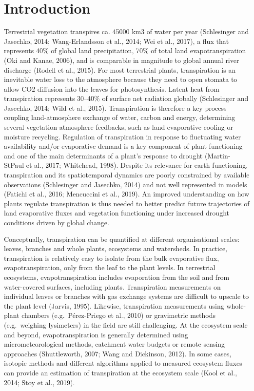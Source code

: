 \documentclass[11pt,twoside]{reedthesis}
\begin{document}
\newpage

\section{Introduction}\label{introduction}

Terrestrial vegetation transpires ca. 45000 km3 of water per year
(Schlesinger and Jasechko, 2014; Wang-Erlandsson et al., 2014; Wei et
al., 2017), a flux that represents 40\% of global land precipitation,
70\% of total land evapotranspiration (Oki and Kanae, 2006), and is
comparable in magnitude to global annual river discharge (Rodell et al.,
2015). For most terrestrial plants, transpiration is an inevitable water
loss to the atmosphere because they need to open stomata to allow CO2
diffusion into the leaves for photosynthesis. Latent heat from
transpiration represents 30--40\% of surface net radiation globally
(Schlesinger and Jasechko, 2014; Wild et al., 2015). Transpiration is
therefore a key process coupling land-atmosphere exchange of water,
carbon and energy, determining several vegetation-atmosphere feedbacks,
such as land evaporative cooling or moisture recycling. Regulation of
transpiration in response to fluctuating water availability and/or
evaporative demand is a key component of plant functioning and one of
the main determinants of a plant's response to drought (Martin‐StPaul et
al., 2017; Whitehead, 1998). Despite its relevance for earth
functioning, transpiration and its spatiotemporal dynamics are poorly
constrained by available observations (Schlesinger and Jasechko, 2014)
and not well represented in models (Fatichi et al., 2016; Mencuccini et
al., 2019). An improved understanding on how plants regulate
transpiration is thus needed to better predict future trajectories of
land evaporative fluxes and vegetation functioning under increased
drought conditions driven by global change.\par

Conceptually, transpiration can be quantified at different
organisational scales: leaves, branches and whole plants, ecosystems and
watersheds. In practice, transpiration is relatively easy to isolate
from the bulk evaporative flux, evapotranspiration, only from the leaf
to the plant levels. In terrestrial ecosystems, evapotranspiration
includes evaporation from the soil and from water-covered surfaces,
including plants. Transpiration measurements on individual leaves or
branches with gas exchange systems are difficult to upscale to the plant
level (Jarvis, 1995). Likewise, transpiration measurements using
whole-plant chambers (e.g.~Pérez-Priego et al., 2010) or gravimetric
methods (e.g.~weighing lysimeters) in the field are still challenging.
At the ecosystem scale and beyond, evapotranspiration is generally
determined using micrometeorological methods, catchment water budgets or
remote sensing approaches (Shuttleworth, 2007; Wang and Dickinson,
2012). In some cases, isotopic methods and different algorithms applied
to measured ecosystem fluxes can provide an estimation of transpiration
at the ecosystem scale (Kool et al., 2014; Stoy et al., 2019).\par
\end{document}
